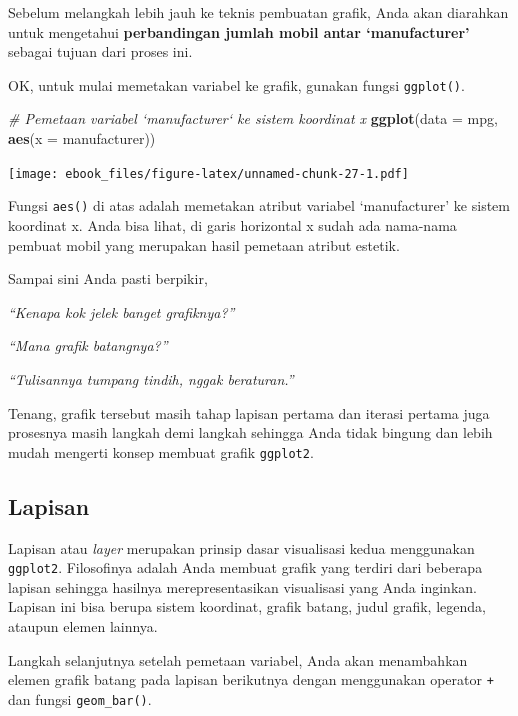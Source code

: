 \documentclass[openany]{book}
\newenvironment{Shaded}{\begin{snugshade}}{\end{snugshade}}
\newcommand{\KeywordTok}[1]{\textcolor[rgb]{0.13,0.29,0.53}{\textbf{#1}}}
\newcommand{\DataTypeTok}[1]{\textcolor[rgb]{0.13,0.29,0.53}{#1}}
\newcommand{\CommentTok}[1]{\textcolor[rgb]{0.56,0.35,0.01}{\textit{#1}}}
\newcommand{\NormalTok}[1]{#1}
\begin{document}
Sebelum melangkah lebih jauh ke teknis pembuatan grafik, Anda akan
diarahkan untuk mengetahui \textbf{perbandingan jumlah mobil antar
`manufacturer'} sebagai tujuan dari proses ini.

OK, untuk mulai memetakan variabel ke grafik, gunakan fungsi
\texttt{ggplot()}.

\begin{Shaded}
\begin{Highlighting}[]
\CommentTok{# Pemetaan variabel `manufacturer` ke sistem koordinat x}
\KeywordTok{ggplot}\NormalTok{(}\DataTypeTok{data =}\NormalTok{ mpg, }\KeywordTok{aes}\NormalTok{(}\DataTypeTok{x =}\NormalTok{ manufacturer))}
\end{Highlighting}
\end{Shaded}

\texttt{[image: ebook\_files/figure-latex/unnamed-chunk-27-1.pdf]}

Fungsi \texttt{aes()} di atas adalah memetakan atribut variabel
`manufacturer' ke sistem koordinat x. Anda bisa lihat, di garis
horizontal x sudah ada nama-nama pembuat mobil yang merupakan hasil
pemetaan atribut estetik.

Sampai sini Anda pasti berpikir,

\emph{``Kenapa kok jelek banget grafiknya?''}

\emph{``Mana grafik batangnya?''}

\emph{``Tulisannya tumpang tindih, nggak beraturan.''}

Tenang, grafik tersebut masih tahap lapisan pertama dan iterasi pertama
juga prosesnya masih langkah demi langkah sehingga Anda tidak bingung
dan lebih mudah mengerti konsep membuat grafik \texttt{ggplot2}.

\subsection{Lapisan}\label{lapisan}

Lapisan atau \emph{layer} merupakan prinsip dasar visualisasi kedua
menggunakan \texttt{ggplot2}. Filosofinya adalah Anda membuat grafik
yang terdiri dari beberapa lapisan sehingga hasilnya merepresentasikan
visualisasi yang Anda inginkan. Lapisan ini bisa berupa sistem
koordinat, grafik batang, judul grafik, legenda, ataupun elemen lainnya.

Langkah selanjutnya setelah pemetaan variabel, Anda akan menambahkan
elemen grafik batang pada lapisan berikutnya dengan menggunakan operator
\texttt{+} dan fungsi \texttt{geom\_bar()}.
\end{document}
